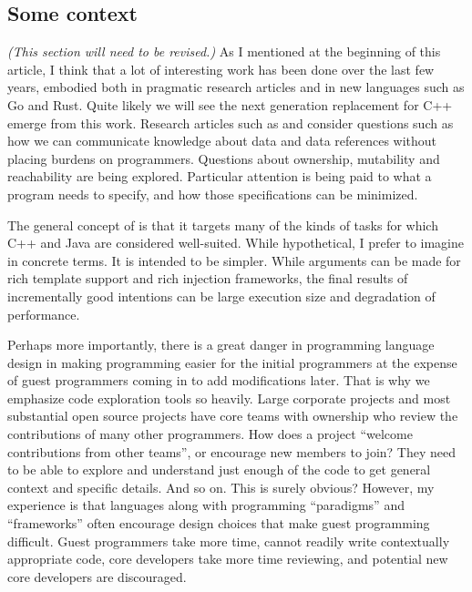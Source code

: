 \documentclass[10pt]{amsart}
\begin{document}
\subsection{Some context}

\emph{(This section will need to be revised.)}
%
As I mentioned at the beginning of this article, I think that a lot of
interesting work has been done over the last few years, embodied both
in pragmatic research articles and in new languages such as Go and
Rust.  Quite likely we will see the next generation replacement for
C++ emerge from this work.  Research articles such as
\cite{GordonCS12} and \cite{CoblenzM16} consider questions such as how
we can communicate knowledge about data and data references without
placing burdens on programmers.  Questions about ownership, mutability
and reachability are being explored.  Particular attention is being
paid to what a program needs to specify, and how those specifications
can be minimized.

The general concept of \Utop is that it targets many of the kinds of
tasks for which C++ and Java are considered well-suited.  While
hypothetical, I prefer to imagine \Utop in concrete terms.  It is
intended to be simpler.  While arguments can be made for rich template
support and rich injection frameworks, the final results of
incrementally good intentions can be large execution size and
degradation of performance.

Perhaps more importantly, there is a great danger in programming
language design in making programming easier for the initial
programmers at the expense of guest programmers coming in to add
modifications later.  That is why we emphasize code exploration tools
so heavily.  Large corporate projects and most substantial open source
projects have core teams with ownership who review the contributions
of many other programmers.  How does a project ``welcome contributions
from other teams'', or encourage new members to join?  They need to be
able to explore and understand just enough of the code to get general
context and specific details.  And so on.  This is surely obvious?
However, my experience is that languages along with programming
``paradigms'' and ``frameworks'' often encourage design choices that
make guest programming difficult.  Guest programmers take more time,
cannot readily write contextually appropriate code, core developers
take more time reviewing, and potential new core developers are
discouraged.
\end{document}
